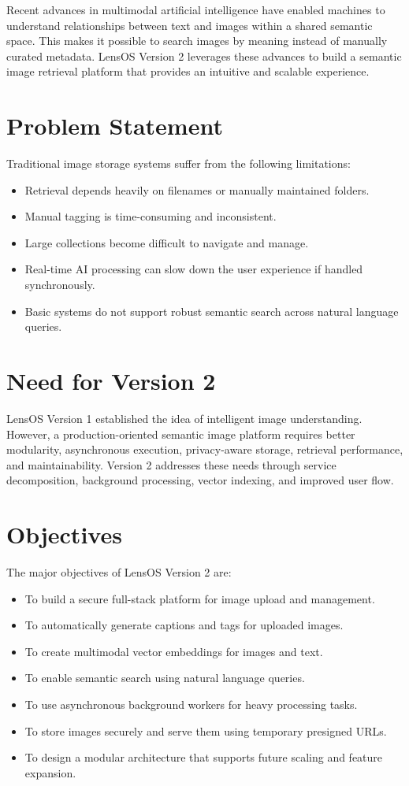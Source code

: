 \documentclass[12pt,a4paper]{report}
\begin{document}
Recent advances in multimodal artificial intelligence have enabled machines to understand relationships between text and images within a shared semantic space. This makes it possible to search images by meaning instead of manually curated metadata. LensOS Version 2 leverages these advances to build a semantic image retrieval platform that provides an intuitive and scalable experience.

\section{Problem Statement}
Traditional image storage systems suffer from the following limitations:
\begin{itemize}[leftmargin=*]
    \item Retrieval depends heavily on filenames or manually maintained folders.
    \item Manual tagging is time-consuming and inconsistent.
    \item Large collections become difficult to navigate and manage.
    \item Real-time AI processing can slow down the user experience if handled synchronously.
    \item Basic systems do not support robust semantic search across natural language queries.
\end{itemize}

\section{Need for Version 2}
LensOS Version 1 established the idea of intelligent image understanding. However, a production-oriented semantic image platform requires better modularity, asynchronous execution, privacy-aware storage, retrieval performance, and maintainability. Version 2 addresses these needs through service decomposition, background processing, vector indexing, and improved user flow.

\section{Objectives}
The major objectives of LensOS Version 2 are:
\begin{itemize}[leftmargin=*]
    \item To build a secure full-stack platform for image upload and management.
    \item To automatically generate captions and tags for uploaded images.
    \item To create multimodal vector embeddings for images and text.
    \item To enable semantic search using natural language queries.
    \item To use asynchronous background workers for heavy processing tasks.
    \item To store images securely and serve them using temporary presigned URLs.
    \item To design a modular architecture that supports future scaling and feature expansion.
\end{itemize}
\end{document}
